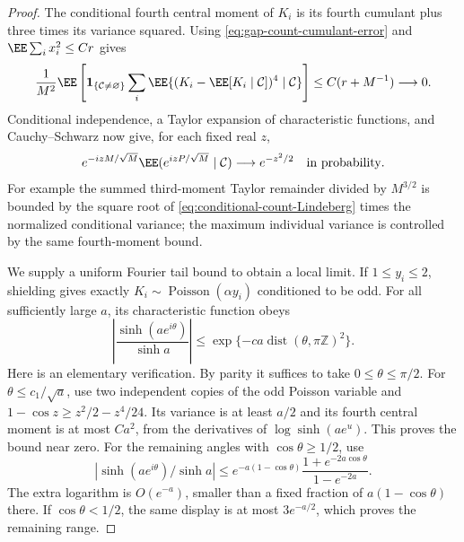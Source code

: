 \documentclass[11pt,letterpaper]{article}
\newcommand{\ind}{\mathbf 1}\newcommand{\Exp}{\operatorname{Exp}}
\begin{document}
\begin{proof}
The conditional fourth central moment of $K_i$ is its fourth
cumulant plus three times its variance squared. Using
\eqref{eq:gap-count-cumulant-error} and
$\EE\sum_i x_i^2\le Cr$ gives
\begin{equation}\label{eq:conditional-count-Lindeberg}
 \frac1{M^2}\EE\left[
   \ind_{\{\mathcal C\ne\varnothing\}}
   \sum_i\EE\{(K_i-\EE[K_i\mid\mathcal C])^4\mid\mathcal C\}
                      \right]\le C(r+M^{-1})\longrightarrow0.
\end{equation}
Conditional independence, a Taylor expansion of characteristic
functions, and Cauchy--Schwarz now give, for each fixed real $z$,
\begin{equation}\label{eq:conditional-count-CF}
 e^{-izM/\sqrt M}\EE(e^{izP/\sqrt M}\mid\mathcal C)
                         \longrightarrow e^{-z^2/2}
                                      \quad\hbox{in probability}.
\end{equation}
For example the summed third-moment Taylor remainder divided by
$M^{3/2}$ is bounded by the square root of
\eqref{eq:conditional-count-Lindeberg} times the normalized
conditional variance; the maximum individual variance is
controlled by the same fourth-moment bound.

We supply a uniform Fourier tail bound to obtain a local limit.
If $1\le y_i\le2$, shielding gives exactly
$K_i\sim\operatorname{Poisson}(\alpha y_i)$ conditioned to be odd.
For all sufficiently large $a$, its characteristic function obeys
\begin{equation}\label{eq:odd-Poisson-CF-bound}
 \left|\frac{\sinh(ae^{i\theta})}{\sinh a}\right|
      \le\exp\{-ca\operatorname{dist}(\theta,\pi\mathbb Z)^2\}.
\end{equation}
Here is an elementary verification. By parity it suffices to take
$0\le\theta\le\pi/2$. For $\theta\le c_1/\sqrt a$, use two
independent copies of the odd Poisson variable and
$1-\cos z\ge z^2/2-z^4/24$. Its variance is at least $a/2$ and
its fourth central moment is at most $Ca^2$, from the derivatives
of $\log\sinh(ae^u)$. This proves the bound near zero.
For the remaining angles with $\cos\theta\ge1/2$, use
\[
 |\sinh(ae^{i\theta})/\sinh a|
 \le e^{-a(1-\cos\theta)}
                 \frac{1+e^{-2a\cos\theta}}{1-e^{-2a}}.
\]
The extra logarithm is $O(e^{-a})$, smaller than a fixed fraction
of $a(1-\cos\theta)$ there. If $\cos\theta<1/2$, the same
display is at most $3e^{-a/2}$, which proves the remaining range.


\end{proof}
\end{document}
